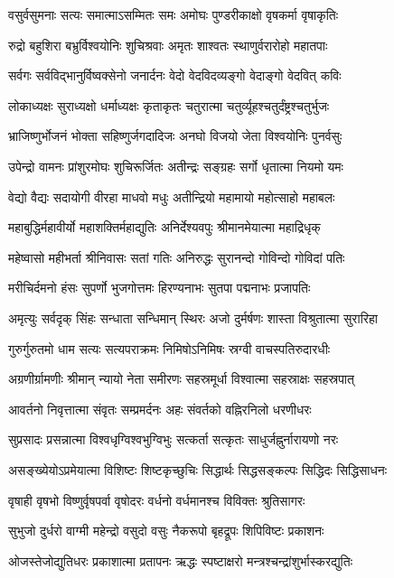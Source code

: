 \twolineshloka
{वसुर्वसुमनाः सत्यः समात्माऽसम्मितः समः}
{अमोघः पुण्डरीकाक्षो वृषकर्मा वृषाकृतिः}

\twolineshloka
{रुद्रो बहुशिरा बभ्रुर्विश्वयोनिः शुचिश्रवाः}
{अमृतः शाश्वतः स्थाणुर्वरारोहो महातपाः}

\twolineshloka
{सर्वगः सर्वविद्भानुर्विष्वक्सेनो जनार्दनः}
{वेदो वेदविदव्यङ्गो वेदाङ्गो वेदवित् कविः}

\twolineshloka
{लोकाध्यक्षः सुराध्यक्षो धर्माध्यक्षः कृताकृतः}
{चतुरात्मा चतुर्व्यूहश्चतुर्दंष्ट्रश्चतुर्भुजः}

\twolineshloka
{भ्राजिष्णुर्भोजनं भोक्ता सहिष्णुर्जगदादिजः}
{अनघो विजयो जेता विश्वयोनिः पुनर्वसुः}

\twolineshloka
{उपेन्द्रो वामनः प्रांशुरमोघः शुचिरूर्जितः}
{अतीन्द्रः सङ्ग्रहः सर्गो धृतात्मा नियमो यमः}

\twolineshloka
{वेद्यो वैद्यः सदायोगी वीरहा माधवो मधुः}
{अतीन्द्रियो महामायो महोत्साहो महाबलः}

\twolineshloka
{महाबुद्धिर्महावीर्यो महाशक्तिर्महाद्युतिः}
{अनिर्देश्यवपुः श्रीमानमेयात्मा महाद्रिधृक्}

\twolineshloka
{महेष्वासो महीभर्ता श्रीनिवासः सतां गतिः}
{अनिरुद्धः सुरानन्दो गोविन्दो गोविदां पतिः}

\twolineshloka
{मरीचिर्दमनो हंसः सुपर्णो भुजगोत्तमः}
{हिरण्यनाभः सुतपा पद्मनाभः प्रजापतिः}

\twolineshloka
{अमृत्युः सर्वदृक् सिंहः सन्धाता सन्धिमान् स्थिरः}
{अजो दुर्मर्षणः शास्ता विश्रुतात्मा सुरारिहा}

\twolineshloka
{गुरुर्गुरुतमो धाम सत्यः सत्यपराक्रमः}
{निमिषोऽनिमिषः स्रग्वी वाचस्पतिरुदारधीः}

\twolineshloka
{अग्रणीर्ग्रामणीः श्रीमान् न्यायो नेता समीरणः}
{सहस्रमूर्धा विश्वात्मा सहस्राक्षः सहस्रपात्}

\twolineshloka
{आवर्तनो निवृत्तात्मा संवृतः सम्प्रमर्दनः}
{अहः संवर्तको वह्निरनिलो धरणीधरः}

\twolineshloka
{सुप्रसादः प्रसन्नात्मा विश्वधृग्विश्वभुग्विभुः}
{सत्कर्ता सत्कृतः साधुर्जह्नुर्नारायणो नरः}

\twolineshloka
{असङ्ख्येयोऽप्रमेयात्मा विशिष्टः शिष्टकृच्छुचिः}
{सिद्धार्थः सिद्धसङ्कल्पः सिद्धिदः सिद्धिसाधनः}

\twolineshloka
{वृषाही वृषभो विष्णुर्वृषपर्वा वृषोदरः}
{वर्धनो वर्धमानश्च विविक्तः श्रुतिसागरः}

\twolineshloka
{सुभुजो दुर्धरो वाग्मी महेन्द्रो वसुदो वसुः}
{नैकरूपो बृहद्रूपः शिपिविष्टः प्रकाशनः}

\twolineshloka
{ओजस्तेजोद्युतिधरः प्रकाशात्मा प्रतापनः}
{ऋद्धः स्पष्टाक्षरो मन्त्रश्चन्द्रांशुर्भास्करद्युतिः}

